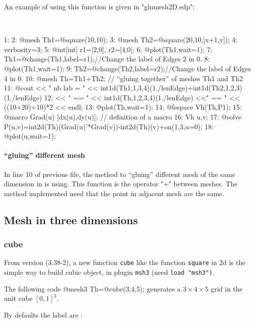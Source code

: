 \documentclass[a4paper,twoside,12pt]{book}
\begin{document}
An example of using this function is given in "glumesh2D.edp":  
\begin{example}
\label{changelabel}~
\bFF

 1:
 2: @mesh Th1=@square(10,10);
 3: @mesh Th2=@square(20,10,[x+1,y]);
 4: verbosity=3;
 5: @int[int] r1=[2,0],  r2=[4,0];
 6: @plot(Th1,wait=1);
 7: Th1=@change(Th1,label=r1);//Change the label of Edges  2 in 0.
 8: @plot(Th1,wait=1);
 9: Th2=@change(Th2,label=r2);//Change the label of Edges  4 in 0.
10: @mesh Th=Th1+Th2;         //  ``gluing together'' of meshes Th1 and Th2
11: @cout << " nb lab = " << int1d(Th1,1,3,4)(1./lenEdge)+int1d(Th2,1,2,3)(1./lenEdge)
12:          << " == " << int1d(Th,1,2,3,4)(1./lenEdge) <<" == " << ((10+20)+10)*2 << endl;
13: @plot(Th,wait=1);
14: @fespace Vh(Th,P1);
15: @macro Grad(u) [dx(u),dy(u)]; // definition of a macro
16: Vh u,v;
17: @solve P(u,v)=int2d(Th)(Grad(u)'*Grad(v))-int2d(Th)(v)+on(1,3,u=0);
18: @plot(u,wait=1);

\eFF
\end{example}

\paragraph{``gluing'' different mesh}
In line 10 of previous file, the method to ``gluing'' different mesh of the same dimension in \freefempp is using.
This function is the operator "+" between meshes. 
The method implemented need that the point in adjacent mesh are the same.


\subsection{Mesh in three dimensions}
\subsubsection{cube}
From version (3.38-2), a new function \texttt{cube} like the function \texttt{square} in 2d is the simple way to build cubic object, in plugin \texttt{msh3} (need \texttt{load "msh3")}.

The following code
\bFF
@mesh3 Th=@cube(3,4,5); 
\eFF
generates a $3\times 4 \times 5$ grid in the unit cube $[0, 1]^3$.

By defaults the label are : 
\end{document}
